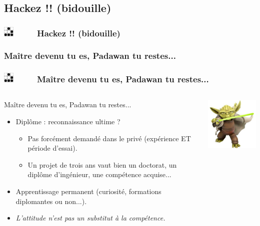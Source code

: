 \documentclass[slidetop,11pt]{beamer}
\def\sectionPartIIIb{Hackez !! (bidouille)}
\def\sectionPartIIIbUN{Ma{\^i}tre devenu tu es, Padawan tu restes...}
\def\moreInFrameTitle{\includegraphics[height=0.5cm]{img/logo_glider.png}~~~~~}
\begin{document}
\subsection{\sectionPartIIIb}
\begin{frame}
	\frametitle{\moreInFrameTitle \sectionPartIIIb}
	\tableofcontents[sections=3,subsectionstyle=show/shaded/hide]
\end{frame} 

\subsubsection{\sectionPartIIIbUN}
\begin{frame}
	\frametitle{\moreInFrameTitle \sectionPartIIIbUN}
	\begin{columns}[c]
	\begin{column}[c]{7cm}
		 \begin{beamerboxesrounded}	[lower=substructureUN, %
		 				 upper=block title UN,%
						 shadow=true]%
		       {\sectionPartIIIbUN}
			\begin{itemize}
				\item Dipl{\^o}me : reconnaissance ultime ?
				\begin{itemize}
					\item Pas forc{\'e}ment demand{\'e} dans le priv{\'e} (exp{\'e}rience ET p{\'e}riode d'essai). 
					\item Un projet de trois ans vaut bien un doctorat, un dipl{\^o}me d'ing{\'e}nieur, une comp{\'e}tence acquise...
				\end{itemize}
				\item Apprentissage permanent (curiosit{\'e}, formations diplomantes ou non...). 
				\item \emph{L'attitude n'est pas un substitut {\`a} la comp{\'e}tence. }
			\end{itemize}
		\end{beamerboxesrounded}
	\end{column}
	\begin{column}[c]{4cm}
		\includegraphics[width=4cm]{img/yodaInCloneWars.png}~\\
	\end{column}
	\end{columns}
\end{frame} 
\end{document}
